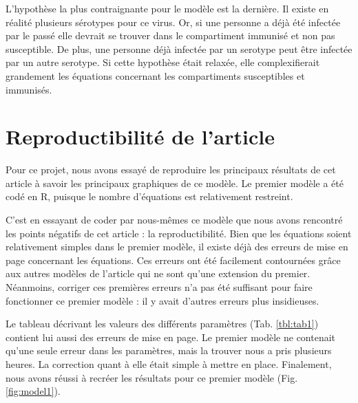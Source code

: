 \documentclass[
  12pt,
  french,
  oneside]{article}
\begin{document}
L'hypothèse la plus contraignante pour le modèle est la dernière. Il
existe en réalité plusieurs sérotypes pour ce virus. Or, si une personne
a déjà été infectée par le passé elle devrait se trouver dans le
compartiment immunisé et non pas susceptible. De plus, une personne déjà
infectée par un serotype peut être infectée par un autre serotype. Si
cette hypothèse était relaxée, elle complexifierait grandement les
équations concernant les compartiments susceptibles et immunisés.

\hypertarget{reproductibilituxe9-de-larticle}{%
\section{Reproductibilité de
l'article}\label{reproductibilituxe9-de-larticle}}

Pour ce projet, nous avons essayé de reproduire les principaux résultats
de cet article à savoir les principaux graphiques de ce modèle. Le
premier modèle a été codé en R, puisque le nombre d'équations est
relativement restreint.

C'est en essayant de coder par nous-mêmes ce modèle que nous avons
rencontré les points négatifs de cet article : la reproductibilité. Bien
que les équations soient relativement simples dans le premier modèle, il
existe déjà des erreurs de mise en page concernant les équations. Ces
erreurs ont été facilement contournées grâce aux autres modèles de
l'article qui ne sont qu'une extension du premier. Néanmoins, corriger
ces premières erreurs n'a pas été suffisant pour faire fonctionner ce
premier modèle : il y avait d'autres erreurs plus insidieuses.

Le tableau décrivant les valeurs des différents paramètres (Tab.
\ref{tbl:tab1}) contient lui aussi des erreurs de mise en page. Le
premier modèle ne contenait qu'une seule erreur dans les paramètres,
mais la trouver nous a pris plusieurs heures. La correction quant à elle
était simple à mettre en place. Finalement, nous avons réussi à recréer
les résultats pour ce premier modèle (Fig. \ref{fig:model1}).
\end{document}
